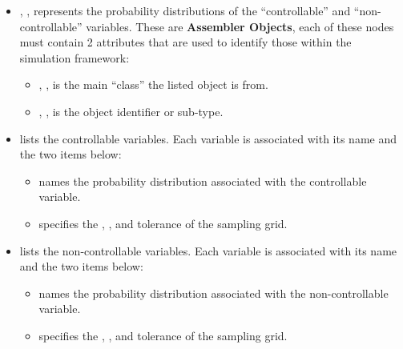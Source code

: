 \begin{itemize}
  \item {}, , represents the probability
  distributions of the ``controllable'' and ``non-controllable'' variables.
  These are \textbf{Assembler Objects}, each of these nodes must contain 2
  attributes that are used to identify those within the simulation framework:
        \begin{itemize}
    \item {}, , is the main
    ``class'' the listed object is from.
                \item {}, , is the object
    identifier or sub-type.
        \end{itemize}
        \item {} lists the controllable variables.
  Each variable is associated with its name and the two items below:
        \begin{itemize}
                \item {} names the probability distribution associated
    with the controllable variable.
                \item {} specifies the , , and
    tolerance of the sampling grid.
        \end{itemize}
        \item {} lists the non-controllable variables.
  Each variable is associated with its name and the two items below:
        \begin{itemize}
                \item {} names the probability distribution associated
    with the non-controllable variable.
                \item {} specifies the , , and
    tolerance of the sampling grid.
                \end{itemize}
\end{itemize}

